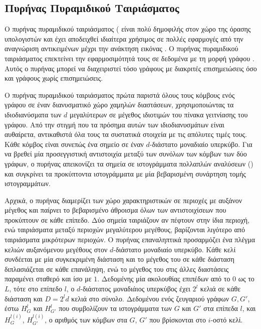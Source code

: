 \subsection{Πυρήνας Πυραμιδικού Ταιριάσματος}
Ο πυρήνας πυραμιδικού ταιριάσματος ( είναι πολύ δημοφιλής στον χώρο της όρασης υπολογιστών και έχει αποδειχθεί ιδιαίτερα χρήσιμος σε πολλές εφαρμογές από την αναγνώριση αντικειμένων μέχρι την ανάκτηση εικόνας \cite{grauman2007pyramid,lazebnik2006beyond}.
Ο πυρήνας πυραμιδικού ταιριάσματος επεκτείνει την εφαρμοσιμότητά τους σε δεδομένα με τη μορφή γράφου \cite{nikolentzos2017matching}.
Αυτός ο πυρήνας μπορεί να διαχειριστεί τόσο γράφους με διακριτές επισημειώσεις όσο και γράφους χωρίς επισημειώσεις.\par
Ο πυρήνας πυραμιδικού ταιριάσματος πρώτα παριστά όλους τους κόμβους ενός γράφου σε έναν διανυσματικό χώρο χαμηλών διαστάσεων, χρησιμοποιώντας τα ιδιοδιανύσματα των $d$ μεγαλύτερων σε μέγεθος ιδιοτιμών του πίνακα γειτνίασης του γράφου.
Από την στιγμή που τα πρόσημα αυτών των ιδιοδιανυσμάτων είναι αυθαίρετα, αντικαθιστά όλα τους τα συστατικά στοιχεία με τις απόλυτες τιμές τους.
Κάθε κόμβος είναι συνεπώς ένα σημείο σε έναν $d$-διάστατο μοναδιαίο υπερκύβο.
Για να βρεθεί μία προσεγγιστική αντιστοιχία μεταξύ των συνόλων των κόμβων των δύο γράφων, ο πυρήνας απεικονίζει τα σημεία σε ιστογράμματα πολλαπλών αναλύσεων () και συγκρίνει τα προκύπτοντα ιστογράμματα με μία βεβαρισμένη συνάρτηση τομής ιστογραμμάτων.\par
Αρχικά, ο πυρήνας διαμερίζει των χώρο χαρακτηριστικών σε περιοχές με αυξάνον μέγεθος και παίρνει το βεβαρισμένο άθροισμα όλων των αντιστοιχίσεων που προκύπτουν σε κάθε επίπεδο.
Δύο σημεία ταιριάζουν αν πέφτουν στην ίδια περιοχή, ενώ ταιριάσματα μεταξύ περιοχών μεγαλύτερου μεγέθους, βαρίζονται λιγότερο από ταιριάσματα μικρότερων περιοχών.
Ο πυρήνας επαναληπτικά προσαρμόζει ένα πλέγμα κελιών αυξανόμενου μεγέθους στον $d$-διάστατο μοναδιαίο υπερκύβο.
Κάθε κελί συνδέεται με μία συγκεκριμένη διάσταση και το μέγεθος του σε κάθε διάσταση διπλασιάζεται σε κάθε επανάληψη, ενώ το μέγεθος του στις άλλες διαστάσεις παραμένει σταθερό και ίσο με $1$.
Δεδομένης μία ακολουθίας επιπέδων από το $0$ ως το $L$, τότε στο επίπεδο $l$, ο $d$-διάστατος μοναδιάιος υπερκύβος έχει $2^l$ κελιά σε κάθε διάσταση και $D = 2^{l}d$ κελιά στο σύνολο.
Δεδομένου ενός ζευγαριού γράφων $G,G'$, έστω $H_{G}^{l}$ και $H_{G'}^{l}$ που συμβολίζουν τα ιστογράμματα των $G$ και $G'$ στα επίπεδα $l$, και $H_{G}^{l(i)}$, $H_{G'}^{l(i)}$, ο αριθμός των κόμβων στα $G$, $G'$ που βρίσκονται στο $i$-οστό κελί.

